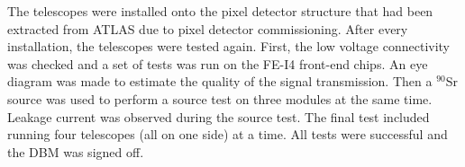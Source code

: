 The telescopes were installed onto the pixel detector structure that had been extracted from ATLAS due to pixel detector commissioning. 
After every installation, the telescopes were tested again. First, the low voltage connectivity was checked and a set of tests was run on the FE-I4 front-end chips. An eye diagram was made to estimate the quality of the signal transmission. Then a $^{90}$Sr source was used to perform a source test on three modules at the same time. Leakage current was observed during the source test. The final test included running four telescopes (all on one side) at a time. All tests were successful and the DBM was signed off.

